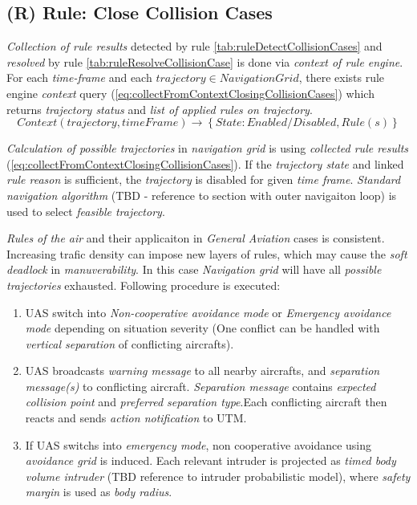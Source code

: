 \subsection{(R) Rule: Close Collision Cases}\label{sec:ruleCloseCollisionCases}    
\noindent\emph{Collection of rule results} detected by rule \ref{tab:ruleDetectCollisionCases} and \emph{resolved} by rule \ref{tab:ruleResolveCollisionCase} is done via \emph{context of rule engine}. For each \emph{time-frame} and each $trajectory\in NavigationGrid$, there exists rule engine \emph{context} query (\ref{eq:collectFromContextClosingCollisionCases}) which returns \emph{trajectory status} and \emph{list of applied rules on trajectory}.
\begin{equation}\label{eq:collectFromContextClosingCollisionCases}
    Context(trajectory,timeFrame) \to \left\{State: Enabled/Disabled, Rule(s)\right\}
\end{equation}

\emph{Calculation of possible trajectories} in \emph{navigation grid} is using \emph{collected rule results} (\ref{eq:collectFromContextClosingCollisionCases}). If the \emph{trajectory state} and linked \emph{rule reason} is sufficient, the \emph{trajectory} is disabled for given \emph{time frame}. \emph{Standard navigation algorithm} (TBD - reference to section with outer navigaiton loop) is used to select \emph{feasible trajectory}. 

\emph{Rules of the air} and their applicaiton in \emph{General Aviation} cases is consistent. Increasing trafic density can impose new layers of rules, which may cause the \emph{soft deadlock} in \emph{manuverability}. In this case \emph{Navigation grid} will have all  \emph{possible trajectories} exhausted. Following procedure is executed:
\begin{enumerate}
    \item UAS switch into \emph{Non-cooperative avoidance mode} or \emph{Emergency avoidance mode} depending on situation severity (One conflict can be handled with \emph{vertical separation} of conflicting aircrafts).
    \item UAS broadcasts \emph{warning message} to all nearby aircrafts, and \emph{separation message(s)} to conflicting aircraft. \emph{Separation message} contains \emph{expected collision point} and \emph{preferred separation type}.Each conflicting aircraft then reacts and sends \emph{action notification} to UTM.
    \item If UAS switchs into \emph{emergency mode}, non cooperative avoidance using \emph{avoidance grid} is induced. Each relevant intruder is projected as \emph{timed body volume intruder} (TBD reference to intruder probabilistic model), where \emph{safety margin} is used as \emph{body radius}.
\end{enumerate}

